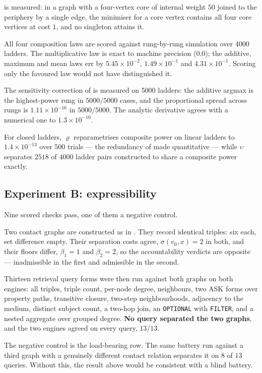 \documentclass[11pt,twocolumn,a4paper]{article}
\theoremstyle{thmstyle}
\theoremstyle{definition}
\theoremstyle{remark}
\newcommand{\flo}{\beta}
\newcommand{\sepc}{\sigma}
\newcommand{\circu}{\varrho}
\newcommand{\unif}{\upsilon}
\begin{document}
 is measured: in a graph with a four-vertex core of internal
weight $50$ joined to the periphery by a single edge, the minimiser for a core
vertex contains all four core vertices at cost $1$, and no singleton attains
it.

All four composition laws are scored against rung-by-rung simulation over
$4000$ ladders. The multiplicative law is exact to machine precision
($0.0$); the additive, maximum and mean laws err by
$5.45\times10^{-2}$, $1.49\times10^{-1}$ and $4.31\times10^{-1}$. Scoring only
the favoured law would not have distinguished it.

The sensitivity correction of  is measured on $5000$
ladders: the additive argmax is the highest-power rung in $5000/5000$ cases,
and the proportional spread across rungs is $1.11\times10^{-16}$ in
$5000/5000$. The analytic derivative agrees with a numerical one to
$1.3\times10^{-10}$.

For closed ladders, $\circu$ reparametrises composite power on linear ladders
to $1.4\times10^{-13}$ over $500$ trials --- the redundancy of
 made quantitative --- while $\unif$ separates $2518$ of
$4000$ ladder pairs constructed to share a composite power exactly.

\subsection{Experiment B: expressibility}
\label{sec:res-b}

Nine scored checks pass, one of them a negative control.

Two contact graphs are constructed as in . They record
identical triples: six each, set difference empty. Their separation costs
agree, $\sepc(v_0,x)=2$ in both, and their floors differ, $\flo_1=1$ and
$\flo_2=2$, so the accountability verdicts are opposite --- inadmissible in
the first and admissible in the second.

Thirteen retrieval query forms were then run against both graphs on both
engines: all triples, triple count, per-node degree, neighbours, two ASK forms
over property paths, transitive closure, two-step neighbourhoods, adjacency to
the medium, distinct subject count, a two-hop join, an \texttt{OPTIONAL} with
\texttt{FILTER}, and a nested aggregate over grouped degree.
\textbf{No query separated the two graphs}, and the two engines agreed on
every query, $13/13$.

The negative control is the load-bearing row. The same battery run against a
third graph with a genuinely different contact relation separates it on
$8$ of $13$ queries. Without this, the result above would be consistent with a
blind battery.
\end{document}
